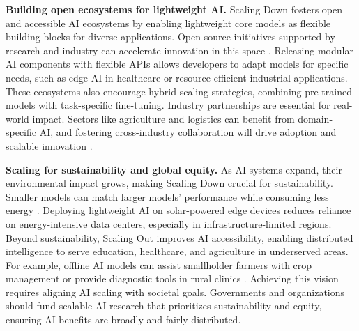 \textbf{Building open ecosystems for lightweight AI.}
Scaling Down fosters open and accessible AI ecosystems by enabling lightweight core models as flexible building blocks for diverse applications. Open-source initiatives supported by research and industry can accelerate innovation in this space \cite{wang2021revise}.
Releasing modular AI components with flexible APIs allows developers to adapt models for specific needs, such as edge AI in healthcare or resource-efficient industrial applications. These ecosystems also encourage hybrid scaling strategies, combining pre-trained models with task-specific fine-tuning.
Industry partnerships are essential for real-world impact. Sectors like agriculture and logistics can benefit from domain-specific AI, and fostering cross-industry collaboration will drive adoption and scalable innovation \cite{schmidt2014how_google_works}.


\textbf{Scaling for sustainability and global equity.}
As AI systems expand, their environmental impact grows, making Scaling Down crucial for sustainability. Smaller models can match larger models' performance while consuming less energy \cite{schwartz2020green_ai}. Deploying lightweight AI on solar-powered edge devices reduces reliance on energy-intensive data centers, especially in infrastructure-limited regions.
Beyond sustainability, Scaling Out improves AI accessibility, enabling distributed intelligence to serve education, healthcare, and agriculture in underserved areas. For example, offline AI models can assist smallholder farmers with crop management or provide diagnostic tools in rural clinics \cite{pal2021ai_social_good}.
Achieving this vision requires aligning AI scaling with societal goals. Governments and organizations should fund scalable AI research that prioritizes sustainability and equity, ensuring AI benefits are broadly and fairly distributed.



